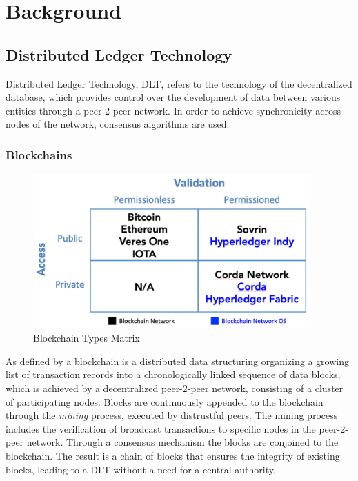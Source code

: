 \chapter{Background}
\label{chap:Background}


\section{Distributed Ledger Technology} %
\label{sec:Distributed Ledger Technology}

Distributed Ledger Technology, DLT, refers to the technology of the decentralized database, which provides control over
the development of data between various entities through a peer-2-peer network. In order to achieve synchronicity across
nodes of the network, consensus algorithms are used.

\subsection{Blockchains} %
\label{sub:Blockchains}

\begin{figure}
	\begin{center}
		\includegraphics[width=0.95\textwidth]{figures/hyperledger-aries-blockchain-type-matrix.png}
	\end{center}
	\caption{Blockchain Types Matrix \cite{hyperledger:aries-rfc}}
	\label{fig:hyperledger-aries-blockchain-type-matrix}
\end{figure}

As defined by \cite{diam-iot-2020} a blockchain is a distributed data structuring organizing a growing list of
transaction records into a chronologically linked sequence of data blocks, which is achieved by a decentralized
peer-2-peer network, consisting of a cluster of participating nodes. Blocks are continuously appended to the blockchain
through the \textit{mining} process, executed by distrustful peers. The mining process includes the verification of
broadcast transactions to specific nodes in the peer-2-peer network. Through a consensus mechanism the blocks are
conjoined to the blockchain. The result is a chain of blocks that ensures the integrity of existing blocks, leading to a
DLT without a need for a central authority.

